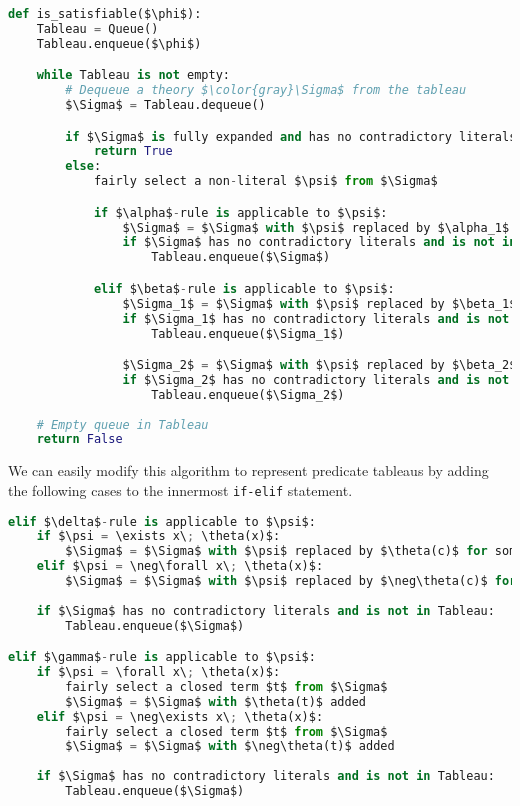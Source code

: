 \begin{lstlisting}[language=python, commentstyle=\color{gray}]
def is_satisfiable($\phi$):
    Tableau = Queue()
    Tableau.enqueue($\phi$)

    while Tableau is not empty:
        # Dequeue a theory $\color{gray}\Sigma$ from the tableau
        $\Sigma$ = Tableau.dequeue()

        if $\Sigma$ is fully expanded and has no contradictory literals:
            return True
        else:
            fairly select a non-literal $\psi$ from $\Sigma$

            if $\alpha$-rule is applicable to $\psi$:
                $\Sigma$ = $\Sigma$ with $\psi$ replaced by $\alpha_1$ and $\alpha_2$
                if $\Sigma$ has no contradictory literals and is not in Tableau:
                    Tableau.enqueue($\Sigma$)

            elif $\beta$-rule is applicable to $\psi$:
                $\Sigma_1$ = $\Sigma$ with $\psi$ replaced by $\beta_1$
                if $\Sigma_1$ has no contradictory literals and is not in Tableau:
                    Tableau.enqueue($\Sigma_1$)

                $\Sigma_2$ = $\Sigma$ with $\psi$ replaced by $\beta_2$
                if $\Sigma_2$ has no contradictory literals and is not in Tableau:
                    Tableau.enqueue($\Sigma_2$)
    
    # Empty queue in Tableau
    return False
\end{lstlisting}


We can easily modify this algorithm to represent predicate tableaus by adding the following cases to the innermost \texttt{if-elif} statement.

\begin{lstlisting}[language=python, commentstyle=\color{gray}]
elif $\delta$-rule is applicable to $\psi$:
    if $\psi = \exists x\; \theta(x)$:
        $\Sigma$ = $\Sigma$ with $\psi$ replaced by $\theta(c)$ for some new constant $c$
    elif $\psi = \neg\forall x\; \theta(x)$:
        $\Sigma$ = $\Sigma$ with $\psi$ replaced by $\neg\theta(c)$ for some new constant $c$
    
    if $\Sigma$ has no contradictory literals and is not in Tableau:
        Tableau.enqueue($\Sigma$)

elif $\gamma$-rule is applicable to $\psi$:
    if $\psi = \forall x\; \theta(x)$:
        fairly select a closed term $t$ from $\Sigma$
        $\Sigma$ = $\Sigma$ with $\theta(t)$ added
    elif $\psi = \neg\exists x\; \theta(x)$:
        fairly select a closed term $t$ from $\Sigma$
        $\Sigma$ = $\Sigma$ with $\neg\theta(t)$ added
    
    if $\Sigma$ has no contradictory literals and is not in Tableau:
        Tableau.enqueue($\Sigma$)
\end{lstlisting}




